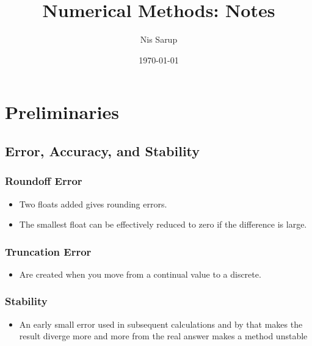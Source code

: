 \documentclass[a4wide,10pt]{article}
\begin{document}
\title{Numerical Methods: Notes}
\author{Nis Sarup}
\date{\today}
\maketitle

\pagebreak

\section{Preliminaries} %
\label{sec:preliminaries}

\subsection{Error, Accuracy, and Stability} %
\label{sub:error_accuracy_and_stability}

\addtocounter{subsubsection}{1}
\subsubsection{Roundoff Error} %
\label{ssub:roundoff_error}
\begin{itemize}
	\item Two floats added gives rounding errors.
	\item The smallest float can be effectively reduced to zero if the difference is large.
\end{itemize}

\subsubsection{Truncation Error} %
\label{ssub:truncation_error}
\begin{itemize}
	\item Are created when you move from a continual value to a discrete.
\end{itemize}

\subsubsection{Stability} %
\label{ssub:stability}
\begin{itemize}
	\item An early small error used in subsequent calculations and by that makes the result diverge more and more from the real answer makes a method unstable
\end{itemize}
\end{document}
